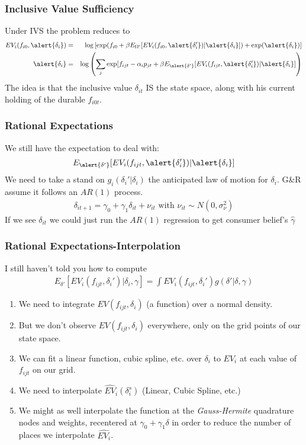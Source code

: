 \begin{frame}
\frametitle{Inclusive Value Sufficiency}
Under IVS the problem reduces to
\begin{eqnarray*}
EV_i(f_{i0}, \alert{\delta_i}) &=& \log\left[ \exp( f_{i0} + \beta E_{\Omega'}[ EV_i (f_{i0}, \alert{\delta_i'}) |\alert{\delta_i}] )+ \exp(\alert{\delta_i})  \right]\\
\alert{\delta_{i}} &=& \log \left( \sum_j \exp[ f_{ijt}  -\alpha_i p_{jt} + \beta E_{\alert{\delta'}}[ E V_i (f_{ijt}, \alert{\delta_i'}) |\alert{\delta_i} ]  \right)
\end{eqnarray*}
The idea is that the inclusive value $\delta_{it}$ IS the state space, along with his current holding of the durable $f_{i0t}$.
\end{frame}


\begin{frame}
\frametitle{Rational Expectations}
We still have the expectation to deal with: 
\begin{eqnarray*}
E_{\alert{\delta'}}[ E V_i (f_{ijt}, \alert{\delta_i'}) |\alert{\delta_i} ]
\end{eqnarray*}
We need to take a stand on $g_i(\delta_i' | \delta_i)$ the anticipated law of motion for $\delta_i$.  G\&R assume it follows an $AR(1)$ process.
\begin{eqnarray*}
\delta_{it+1} = \gamma_0 + \gamma_1 \delta_{it} + \nu_{it} \mbox{ with } \nu_{it} \sim N(0,\sigma_{\nu}^2)
\end{eqnarray*}
If we see $\delta_{it}$ we could just run the $AR(1)$ regression to get consumer belief's $\hat{\gamma}$
\end{frame}


\begin{frame}
\frametitle{Rational Expectations-Interpolation}
I still haven't told you how to compute
\begin{eqnarray*}
E_{\delta'}[ E V_i (f_{ijt}, \delta_i') |\delta_i ,\gamma]= \int EV_i(f_{ijt},\delta_{i}') g(\delta' | \delta,\gamma)
\end{eqnarray*}
\vspace{-0.5cm}
\begin{enumerate}
\item We need to integrate $EV(f_{ijt},\delta_i)$ (a function) over a normal density.
\item But we don't observe $EV(f_{ijt},\delta_i)$ everywhere, only on the grid points of our state space.
\item We can fit a linear function, cubic spline, etc. over $\delta_i$ to $EV_i$ at each value of $f_{ijt}$ on our grid.
\item  We need to \alert{interpolate} $\widehat{EV}_i(\delta_i^s)$ (Linear, Cubic Spline, etc.)
\item We might as well interpolate the function at the \textit{Gauss-Hermite} quadrature nodes and weights, recentered at $\gamma_0 + \gamma_1 \delta$ in order to reduce the number of places we interpolate $\widehat{EV_i}$.
\end{enumerate}
\end{frame}

